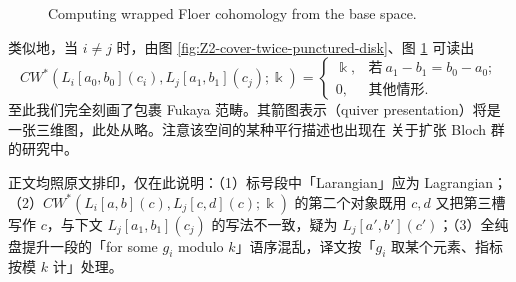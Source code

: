 \begin{exmp}
\begin{figure}[ht]
        \caption{Computing wrapped Floer cohomology from the base space.\label{fig:computation-Z2-cover}}
    \end{figure}
    类似地，当 $i\neq j$ 时，由图 \ref{fig:Z2-cover-twice-punctured-disk}、图 \ref{fig:computation-Z2-cover} 可读出
\[
    CW^{\ast}\left(L_i [a_0, b_0](c_i),L_j[a_1,b_1](c_j);\Bbbk\right)=\left\{\begin{array}{ll}
        \Bbbk,&\text{若}\ a_1-b_1 =b_0-a_0;\\
        0,&\text{其他情形}.
    \end{array}\right.
\]
至此我们完全刻画了包裹 Fukaya 范畴。其箭图表示（quiver presentation）将是一张三维图，此处从略。注意该空间的某种平行描述也出现在 \cite{Neumann04} 关于扩张 Bloch 群的研究中。
\end{exmp}

\begin{yizhu}[原文此处若干笔误]
    正文均照原文排印，仅在此说明：（1）标号段中「Larangian」应为 Lagrangian；（2）$CW^{\ast}\left(L_i [a,b](c),L_j[c,d](c);\Bbbk\right)$ 的第二个对象既用 $c,d$ 又把第三槽写作 $c$，与下文 $L_j[a_1,b_1](c_j)$ 的写法不一致，疑为 $L_j[a',b'](c')$；（3）全纯盘提升一段的「for some $g_i$ modulo $k$」语序混乱，译文按「$g_i$ 取某个元素、指标按模 $k$ 计」处理。
\end{yizhu}

